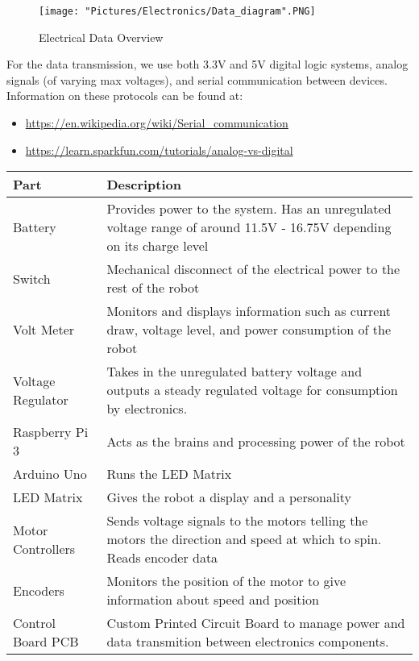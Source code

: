 \documentclass{article}
\begin{document}
\begin{figure}[H]
  	\centering
   	\texttt{[image: "Pictures/Electronics/Data\_diagram".PNG]}
  	\caption{Electrical Data Overview}
	\label{data}
\end{figure}

\noindent For the data transmission, we use both 3.3V and 5V digital logic systems, analog signals (of varying max voltages), and serial communication between devices. Information on these protocols can be found at:

\begin{itemize}
	\item \href{https://en.wikipedia.org/wiki/Serial_communication}{https://en.wikipedia.org/wiki/Serial\_communication}
	\item \href{https://learn.sparkfun.com/tutorials/analog-vs-digital}{https://learn.sparkfun.com/tutorials/analog-vs-digital}
\end{itemize}


\begin{tabular}[2]{|p{4cm}|p{11cm}|}
	\hline
	\textbf{Part} & \textbf{Description} \\ \hline
	Battery & Provides power to the system. Has an unregulated voltage range of around 11.5V - 16.75V depending on its charge level \\ \hline
	Switch & Mechanical disconnect of the electrical power to the rest of the robot \\ \hline
	Volt Meter & Monitors and displays information such as current draw, voltage level, and power consumption of the robot \\ \hline
	Voltage Regulator & Takes in the unregulated battery voltage and outputs a steady regulated voltage for consumption by electronics. \\ \hline
	Raspberry Pi 3 & Acts as the brains and processing power of the robot \\ \hline
	Arduino Uno & Runs the LED Matrix \\ \hline
	LED Matrix & Gives the robot a display and a personality\\ \hline
	Motor Controllers & Sends voltage signals to the motors telling the motors the direction and speed at which to spin. Reads encoder data \\ \hline
	Encoders & Monitors the position of the motor to give information about speed and position \\ \hline
	Control Board PCB & Custom Printed Circuit Board to manage power and data transmition between electronics components. \\ \hline
\end{tabular}
\end{document}
